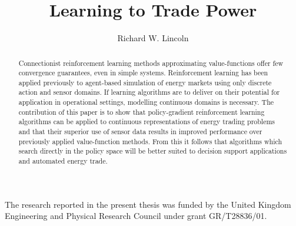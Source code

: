 \documentclass{strath_thesis}
\title{Learning to Trade Power}
\author{Richard W. Lincoln}
\begin{document}
\maketitle

\setcounter{page}{1}

\declaration

\begin{acknowledgements}
The research reported in the present thesis was funded by the United Kingdom
Engineering and Physical Research Council under grant GR/T28836/01.
\end{acknowledgements}

\begin{abstract}
Connectionist reinforcement learning methods approximating value-functions
offer few convergence guarantees, even in simple systems.  Reinforcement
learning has been applied previously to agent-based simulation of energy
markets using only discrete action and sensor domains. If learning algorithms
are to deliver on their potential for application in operational settings,
modelling continuous domains is necessary.  The contribution of this paper is
to show that policy-gradient reinforcement learning algorithms can be applied
to continuous representations of energy trading problems and that their
superior use of sensor data results in improved performance over previously
applied value-function methods.  From this it follows that algorithms which
search directly in the policy space will be better suited to decision support
applications and automated energy trade.
\end{abstract}

\tableofcontents
\newpage
\listoffigures
\newpage
\listoftables
\newpage

\setcounter{page}{1}

\onehalfspacing












\renewcommand{\bibname}{Bibliography}

\end{document}
